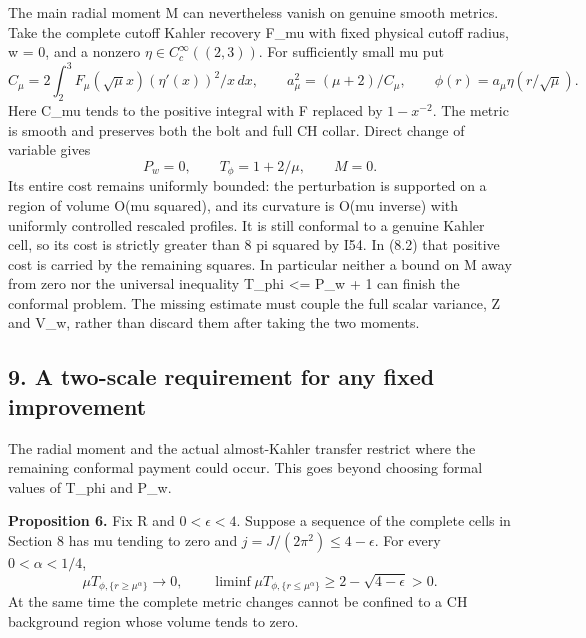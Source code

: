 \documentclass[
  10pt,
]{article}
\begin{document}
The main radial moment M can nevertheless vanish on genuine smooth
metrics. Take the complete cutoff Kahler recovery F\_mu with fixed
physical cutoff radius, w = 0, and a nonzero
\(\eta\in C_c^\infty((2,3))\). For sufficiently small mu put \[
 C_\mu=2\int_2^3F_\mu(\sqrt\mu x)(\eta'(x))^2/x\,dx,
 \qquad a_\mu^2=(\mu+2)/C_\mu,
 \qquad \phi(r)=a_\mu\eta(r/\sqrt\mu).
\] Here C\_mu tends to the positive integral with F replaced by
\(1-x^{-2}\). The metric is smooth and preserves both the bolt and full
CH collar. Direct change of variable gives \[
             P_w=0,\qquad T_\phi=1+2/\mu,\qquad M=0.
\] Its entire cost remains uniformly bounded: the perturbation is
supported on a region of volume O(mu squared), and its curvature is O(mu
inverse) with uniformly controlled rescaled profiles. It is still
conformal to a genuine Kahler cell, so its cost is strictly greater than
8 pi squared by I54. In (8.2) that positive cost is carried by the
remaining squares. In particular neither a bound on M away from zero nor
the universal inequality T\_phi \textless= P\_w + 1 can finish the
conformal problem. The missing estimate must couple the full scalar
variance, Z and V\_w, rather than discard them after taking the two
moments.

\hypertarget{a-two-scale-requirement-for-any-fixed-improvement}{%
\subsection{9. A two-scale requirement for any fixed
improvement}\label{a-two-scale-requirement-for-any-fixed-improvement}}

The radial moment and the actual almost-Kahler transfer restrict where
the remaining conformal payment could occur. This goes beyond choosing
formal values of T\_phi and P\_w.

\textbf{Proposition 6.} Fix R and \(0<\epsilon<4\). Suppose a sequence
of the complete cells in Section 8 has mu tending to zero and
\(j=J/(2\pi^2)\le4-\epsilon\). For every \(0<\alpha<1/4\), \[
 \mu T_{\phi,\{r\ge\mu^\alpha\}}\longrightarrow0,
 \qquad
 \liminf\mu T_{\phi,\{r\le\mu^\alpha\}}
                       \ge2-\sqrt{4-\epsilon}>0.         \tag{9.1}
\] At the same time the complete metric changes cannot be confined to a
CH background region whose volume tends to zero.
\end{document}

